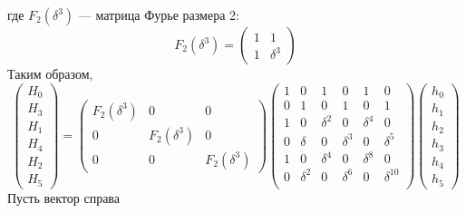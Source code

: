 где $F_2(\delta^3)$ --- матрица Фурье размера 2:
\[
    F_2(\delta^3)
    = \begin{pmatrix}
        1 & 1        \\
        1 & \delta^3
    \end{pmatrix}
\]
Таким образом,
\[
    \begin{pmatrix}
        H_0 \\
        H_3 \\
        H_1 \\
        H_4 \\
        H_2 \\
        H_5
    \end{pmatrix}
    =
    \begin{pmatrix}
        F_2(\delta^3) & 0             & 0             \\
        0             & F_2(\delta^3) & 0             \\
        0             & 0             & F_2(\delta^3)
    \end{pmatrix}
    \begin{pmatrix}
        1 & 0        & 1        & 0        & 1        & 0           \\
        0 & 1        & 0        & 1        & 0        & 1           \\
        1 & 0        & \delta^2 & 0        & \delta^4 & 0           \\
        0 & \delta   & 0        & \delta^3 & 0        & \delta^5    \\
        1 & 0        & \delta^4 & 0        & \delta^8 & 0           \\
        0 & \delta^2 & 0        & \delta^6 & 0        & \delta^{10} \\
    \end{pmatrix}
    \begin{pmatrix}
        h_0 \\
        h_1 \\
        h_2 \\
        h_3 \\
        h_4 \\
        h_5
    \end{pmatrix}
\]
Пусть вектор справа

